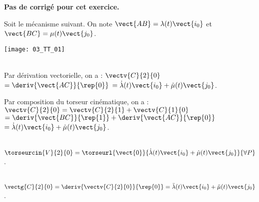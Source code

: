 \normaltrue
\correctiontrue



\setcounter{question}{0}
\ifcorrection
\else
\textbf{Pas de corrigé pour cet exercice.}
\fi

\ifprof
\else
Soit le mécanisme suivant. On note $\vect{AB}=\lambda(t)\vect{i_0}$ et $\vect{BC}=\mu(t)\vect{j_0}$.
\begin{center}
\texttt{[image: 03\_TT\_01]}
\end{center}
\fi

\ifprof
\else
{}
\fi

\ifprof~\\ 

Par dérivation vectorielle, on a : $\vectv{C}{2}{0} $
$ = \deriv{\vect{AC}}{\rep{0}}$
$ = \dot{\lambda}(t)\vect{i_0}+\dot{\mu}(t)\vect{j_0}$.

Par composition du torseur cinématique, on a : 
$\vectv{C}{2}{0} = \vectv{C}{2}{1} +\vectv{C}{1}{0}$
$ = \deriv{\vect{BC}}{\rep{1}}+\deriv{\vect{AC}}{\rep{0}}$
$ = \dot{\lambda}(t)\vect{i_0}+\dot{\mu}(t)\vect{j_0}$.
\else
\fi

\ifprof ~\\
$\torseurcin{V}{2}{0}= \torseurl{\vect{0}}{\dot{\lambda}(t)\vect{i_0}+\dot{\mu}(t)\vect{j_0}}{\forall P}$.
\else
\fi

\ifprof ~\\
 $\vectg{C}{2}{0} = \deriv{\vectv{C}{2}{0}}{\rep{0}}=\ddot{\lambda}(t)\vect{i_0}+\ddot{\mu}(t)\vect{j_0}$.
\else
\fi




